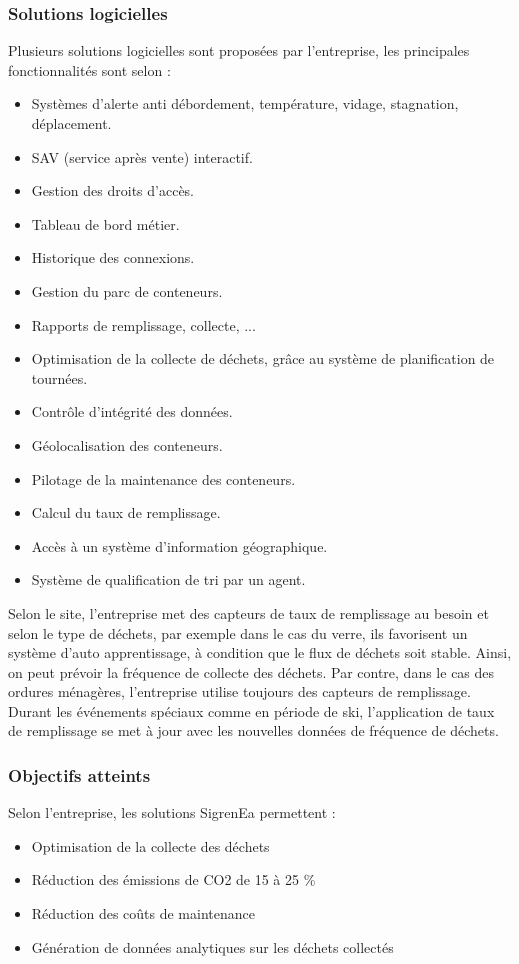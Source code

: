 \documentclass[a4paper,12pt]{report}
\begin{document}
\subsubsection{Solutions logicielles }
Plusieurs solutions logicielles sont proposées par l'entreprise, les principales fonctionnalités sont selon \cite{ref5}:
\begin{itemize}
\item Systèmes d'alerte anti débordement, température, vidage, stagnation, déplacement.
\item SAV (service après vente) interactif.
\item Gestion des droits d'accès. 
\item Tableau de bord métier.
\item Historique des connexions.
\item Gestion du parc de conteneurs.
\item Rapports de remplissage, collecte, ...
\item Optimisation de la collecte de déchets, grâce au système de planification de tournées.
\item Contrôle d'intégrité des données.
\item Géolocalisation des conteneurs.
\item Pilotage de la maintenance des conteneurs.
\item Calcul du taux de remplissage.
\item Accès à un système d'information géographique.
\item Système de qualification de tri par un agent.
 
\end{itemize}

Selon le site, l'entreprise met des capteurs de taux de remplissage au besoin et selon le type de déchets, par exemple dans le cas du verre, ils favorisent  un système d'auto apprentissage, à condition que le flux de déchets soit stable. Ainsi, on peut prévoir la fréquence de collecte des déchets. Par contre, dans le cas des ordures ménagères, l'entreprise utilise toujours des capteurs de remplissage.\\
Durant les événements spéciaux comme en période de ski, l'application de taux de remplissage se met à jour avec les nouvelles données de fréquence de déchets. 
\subsubsection*{Objectifs atteints }
Selon l'entreprise, les solutions SigrenEa permettent :
\begin{itemize}
\item Optimisation de la collecte des déchets
\item Réduction des émissions de CO2 de 15 à 25 \%
\item Réduction des coûts de maintenance
\item Génération de données analytiques sur les déchets collectés
\end{itemize}
\end{document}

